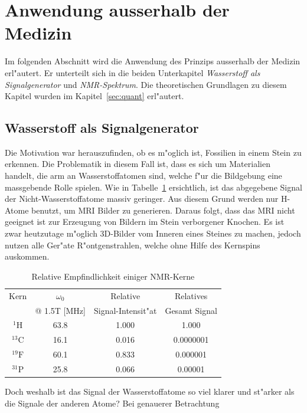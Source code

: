 \section{Anwendung ausserhalb der Medizin \label{chapter:MRI:bsp}}
Im folgenden Abschnitt wird die Anwendung des Prinzips ausserhalb
der Medizin erl"autert. Er unterteilt sich in die beiden Unterkapitel
{\em Wasserstoff als Signalgenerator} und {\em NMR-Spektrum}. Die
theoretischen Grundlagen zu diesem Kapitel wurden im
Kapitel~\ref{sec:quant} erl"autert.

\subsection{Wasserstoff als Signalgenerator}
Die Motivation war herauszufinden, ob es m"oglich ist, Fossilien
in einem Stein zu erkennen. Die Problematik in diesem Fall ist,
dass es sich um Materialien handelt, die arm an Wasserstoffatomen
sind, welche f"ur die Bildgebung eine massgebende Rolle spielen.
Wie in Tabelle~\ref{mri:bsp:tab:NMR_Kerne} ersichtlich, ist das
abgegebene Signal der Nicht-Wasserstoffatome massiv geringer. Aus
diesem Grund werden nur H-Atome benutzt, um MRI Bilder zu generieren.
Daraus folgt, dass das MRI nicht geeignet ist zur Erzeugung von
Bildern im Stein verborgener Knochen. Es ist zwar heutzutage m"oglich
3D-Bilder vom Inneren eines Steines zu machen, jedoch nutzen alle
Ger"ate R"ontgenstrahlen, welche ohne Hilfe des Kernspins auskommen.
\begin{table}
	\centering
	\begin{tabular}{|c|c|c|c|}
		\hline
		Kern 				& $\omega_0$ 	& Relative 				& Relatives\\
							& @ 1.5T [MHz] 	& Signal-Intensit"at 	& Gesamt Signal\\
		\hline
		$\mathrm{^{1}H}$ 	& 63.8 			& 1.000 				& 1.000 \\
		$\mathrm{^{13}C}$ 	& 16.1 			& 0.016 				& 0.0000001 \\
		$\mathrm{^{19}F}$ 	& 60.1 			& 0.833 				& 0.000001 \\
		$\mathrm{^{31}P}$ 	& 25.8 			& 0.066 				& 0.00001 \\
		\hline
	\end{tabular}
	\caption{Relative Empfindlichkeit einiger NMR-Kerne \cite{skript:mri:AMSM_Paper}}
	\label{mri:bsp:tab:NMR_Kerne}
\end{table}
Doch weshalb ist das Signal der Wasserstoffatome so viel klarer und
st"arker als die Signale der anderen Atome? Bei genauerer Betrachtung
